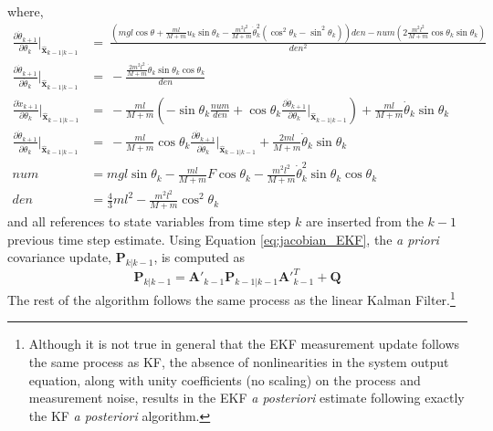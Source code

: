 \documentclass{article}
\newcommand{\matr}[1]{\bm{#1}}     %
\begin{document}
where,
\begin{align*}
\frac{\partial \dot{\theta}_{k+1}}{\partial \theta_k}\Big|_{\hat{\matr{x}}_{k-1|k-1}} &= \
\frac{(mgl\cos\theta + \frac{ml}{M+m}u_k\sin\theta_k - \frac{m^2l^2}{M+m}\dot{\theta}_k^2(\cos^2\theta_k-\sin^2\theta_k))den - num(2\frac{m^2l^2}{M+m}\cos\theta_k\sin\theta_k)}{den^2} \\
\frac{\partial \dot{\theta}_{k+1}}{\partial \dot{\theta}_k}\Big|_{\hat{\matr{x}}_{k-1|k-1}} &=\
-\frac{\frac{2m^2l^2}{M+m}\dot{\theta}_k\sin\theta_k\cos\theta_k}{den} \\
\frac{\partial \dot{x}_{k+1}}{\partial \theta_k}\Big|_{\hat{\matr{x}}_{k-1|k-1}} &=\
-\frac{ml}{M+m}(-\sin\theta_k \frac{num}{den} + \cos\theta_k\frac{\partial \dot{\theta}_{k+1}}{\partial \theta_k}\Big|_{\hat{\matr{x}}_{k-1|k-1}}) + \frac{ml}{M+m}\dot{\theta}_k\sin\theta_k \\
\frac{\partial \dot{\theta}_{k+1}}{\partial \dot{\theta}_k}\Big|_{\hat{\matr{x}}_{k-1|k-1}} &=\
-\frac{ml}{M+m}\cos\theta_k\frac{\partial \dot{\theta}_{k+1}}{\partial \dot{\theta}_k}\Big|_{\hat{\matr{x}}_{k-1|k-1}} + \frac{2ml}{M+m}\dot{\theta}_k\sin\theta_k \\
num &= mgl\sin\theta_k - \frac{ml}{M+m} F\cos\theta_k -\frac{m^2l^2}{M+m}\dot{\theta}_k^2\sin\theta_k\cos\theta_k \\
den &= \frac{4}{3}ml^2-\frac{m^2l^2}{M+m}\cos^2 \theta_k
\end{align*}
and all references to state variables from time step $k$ are inserted from the $k-1$ previous time step estimate.
Using Equation \ref{eq:jacobian_EKF}, the \textit{a priori} covariance update, $\matr{P}_{k|k-1}$, is computed as
\begin{equation}
\matr{P}_{k|k-1} = \matr{A}'_{k-1} \matr{P}_{k-1|k-1} {\matr{A}'}_{k-1}^T + \matr{Q}
\end{equation}
The rest of the algorithm follows the same process as the linear Kalman Filter.\footnote{Although it is not true in general that the EKF measurement update follows the same process as KF, the absence of nonlinearities in the system output equation, along with unity coefficients (no scaling) on the process and measurement noise, results in the EKF \textit{a posteriori} estimate following exactly the KF \textit{a posteriori} algorithm.}
\end{document}
